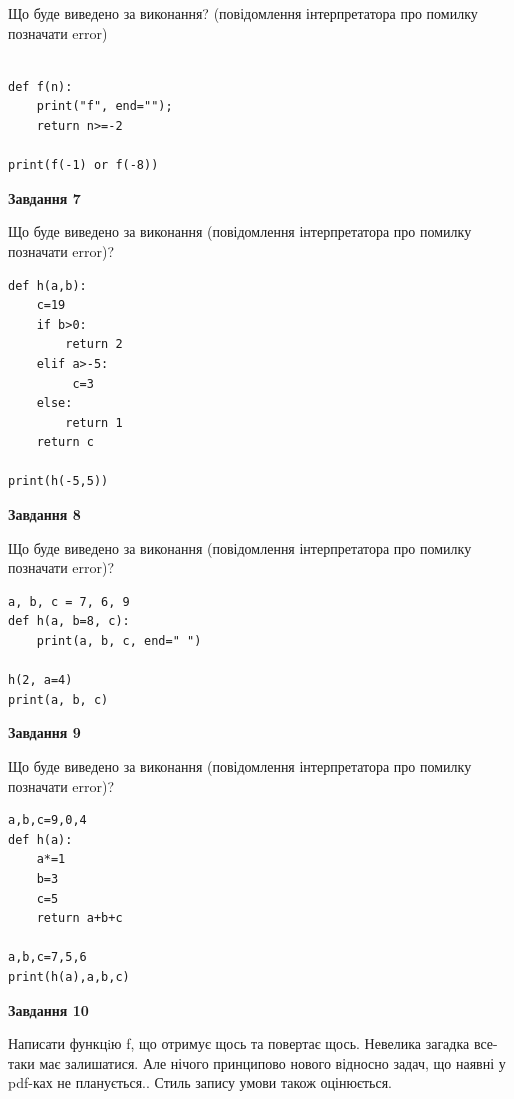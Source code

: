 \documentclass[12pt, ukrainian]{article}
\begin{document}
{\begin {large}
Що буде виведено за виконання? (повідомлення інтерпретатора про помилку позначати error)\par
\begin{verbatim}

def f(n):
    print("f", end="");
    return n>=-2

print(f(-1) or f(-8))
\end{verbatim}

{\begin {center}\textbf{Завдання 7}\end {center}}

Що буде виведено за виконання (повідомлення інтерпретатора про помилку позначати error)?\par
\begin{verbatim}
def h(a,b):
    c=19
    if b>0:
        return 2
    elif a>-5:
         c=3
    else: 
        return 1
    return c

print(h(-5,5))
\end{verbatim}

{\begin {center}\textbf{Завдання 8}\end {center}}

Що буде виведено за виконання (повідомлення інтерпретатора про помилку позначати error)?\par
\begin{verbatim}
a, b, c = 7, 6, 9
def h(a, b=8, c):
    print(a, b, c, end=" ")

h(2, a=4)
print(a, b, c)
\end{verbatim}

{\begin {center}\textbf{Завдання 9}\end {center}}

Що буде виведено за виконання (повідомлення інтерпретатора про помилку позначати error)?\par
\begin{verbatim}
a,b,c=9,0,4
def h(a):
    a*=1
    b=3
    c=5
    return a+b+c

a,b,c=7,5,6
print(h(a),a,b,c)
\end{verbatim}

{\begin {center}\textbf{Завдання 10}\end {center}}


Написати функцiю f, що отримує щось та повертає щось. Невелика загадка все-таки має залишатися. Але нічого принципово нового відносно задач, що наявні у pdf-ках не планується.. Стиль запису умови також оцінюється.\par
\end {large}}
\newpage
\end{document}
